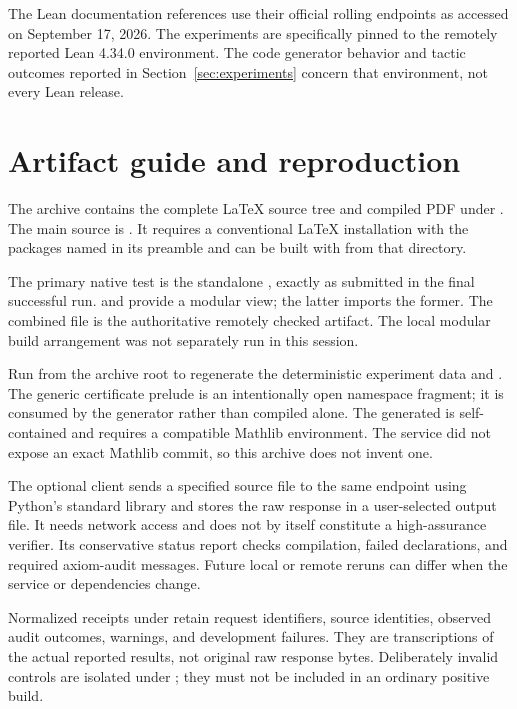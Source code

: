 The Lean documentation references use their official rolling endpoints as accessed on September 17, 2026. The experiments are specifically pinned to the remotely reported Lean 4.34.0 environment. The code generator behavior and tactic outcomes reported in Section~\ref{sec:experiments} concern that environment, not every Lean release.

\section{Artifact guide and reproduction}
\label{app:artifacts}
The archive contains the complete LaTeX source tree and compiled PDF under . The main source is . It requires a conventional LaTeX installation with the packages named in its preamble and can be built with  from that directory.

The primary native test is the standalone , exactly as submitted in the final successful run.  and  provide a modular view; the latter imports the former. The combined file is the authoritative remotely checked artifact. The local modular build arrangement was not separately run in this session.

Run  from the archive root to regenerate the deterministic experiment data and . The generic certificate prelude is an intentionally open namespace fragment; it is consumed by the generator rather than compiled alone. The generated  is self-contained and requires a compatible Mathlib environment. The service did not expose an exact Mathlib commit, so this archive does not invent one.

The optional  client sends a specified source file to the same endpoint using Python's standard library and stores the raw response in a user-selected output file. It needs network access and does not by itself constitute a high-assurance verifier. Its conservative status report checks compilation, failed declarations, and required axiom-audit messages. Future local or remote reruns can differ when the service or dependencies change.

Normalized receipts under  retain request identifiers, source identities, observed audit outcomes, warnings, and development failures. They are transcriptions of the actual reported results, not original raw response bytes. Deliberately invalid controls are isolated under ; they must not be included in an ordinary positive build.

